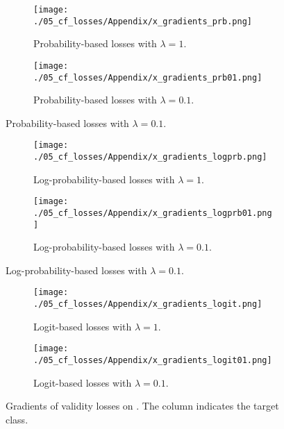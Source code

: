 \documentclass[../main.tex]{subfiles}
\begin{document}
\begin{figure}
    \centering

    \begin{subfigure}[b]{\textwidth}
        \centering
        \texttt{[image: ./05\_cf\_losses/Appendix/x\_gradients\_prb.png]}
        \caption{Probability-based losses with $\lambda=1$.}
    \end{subfigure}
    \begin{subfigure}[b]{\textwidth}
        \centering
        \texttt{[image: ./05\_cf\_losses/Appendix/x\_gradients\_prb01.png]}
        \caption{Probability-based losses with $\lambda=0.1$.}
    \end{subfigure}
\end{figure}
\begin{figure}\ContinuedFloat
    \centering
    \begin{subfigure}[b]{\textwidth}
        \centering
        \texttt{[image: ./05\_cf\_losses/Appendix/x\_gradients\_logprb.png]}
        \caption{Log-probability-based losses with $\lambda=1$.}
    \end{subfigure}
    \begin{subfigure}[b]{\textwidth}
        \centering
        \texttt{[image: ./05\_cf\_losses/Appendix/x\_gradients\_logprb01.png]}
        \caption{Log-probability-based losses with $\lambda=0.1$.}
    \end{subfigure}
\end{figure}
\begin{figure}\ContinuedFloat
    \begin{subfigure}[b]{\textwidth}
        \centering
        \texttt{[image: ./05\_cf\_losses/Appendix/x\_gradients\_logit.png]}
        \caption{Logit-based losses with $\lambda=1$.}
    \end{subfigure}
    \begin{subfigure}[b]{\textwidth}
        \centering
        \texttt{[image: ./05\_cf\_losses/Appendix/x\_gradients\_logit01.png]}
        \caption{Logit-based losses with $\lambda=0.1$.}
    \end{subfigure}

    \caption{Gradients of validity losses on \CakeOnSea. The column indicates the target class.}
\end{figure}
\end{document}
